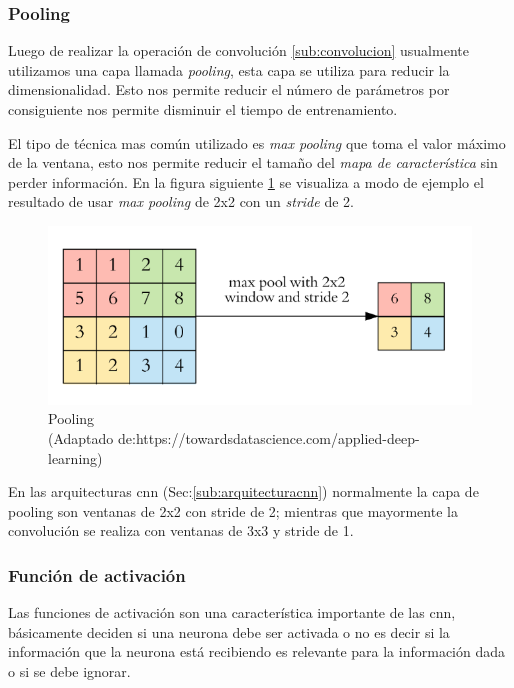 \subsubsection{Pooling}\label{sub:pooling}

Luego de realizar la operación de convolución \ref{sub:convolucion} usualmente utilizamos una capa llamada \textit{pooling}, esta capa se utiliza para reducir la dimensionalidad. Esto nos permite reducir el número de parámetros por consiguiente nos permite disminuir el tiempo de entrenamiento.

El tipo de técnica mas común utilizado es \textit{max pooling} que toma el valor máximo de la ventana, esto nos permite reducir el tamaño del \textit{mapa de característica} sin perder información. En la figura siguiente \ref{Fig:Pooling} se visualiza a modo de ejemplo el resultado de usar \textit{max pooling} de 2x2 con un \textit{stride} de 2.

\begin{figure}[H]
 \centering
  \includegraphics[scale=0.4,keepaspectratio=true,clip=true]{imagenes/MarcoTeorico/pooling_1.png}
  \caption{Pooling \\(Adaptado de:https://towardsdatascience.com/applied-deep-learning)} \label{Fig:Pooling}
\end{figure}

En las arquitecturas \ac{cnn} (Sec:\ref{sub:arquitecturacnn}) normalmente la capa de pooling son ventanas de 2x2 con stride de 2; mientras que mayormente la convolución se realiza con ventanas de 3x3 y stride de 1. 

\subsubsection{Función de activación}\label{sub:relu}
Las funciones de activación son una característica  importante de las \ac{cnn}, básicamente deciden si una neurona debe ser activada o no es decir si la información que la neurona está recibiendo es relevante para la información dada o si se debe ignorar.

